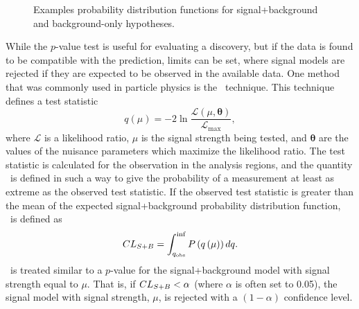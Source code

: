 \begin{figure}[t]
  \centering
  \caption{
    Examples probability distribution functions for signal+background and
    background-only hypotheses.
  }
  \label{fig:example_pdfs}
\end{figure}

While the $p$-value test is useful for evaluating a discovery, but if the
data is found to be compatible with the prediction, limits can be set, where
signal models are rejected if they are expected to be observed in the available
data.
One method that was commonly used in particle physics is the \clsb\ technique.
This technique defines a test statistic
\begin{equation}
  q\left( \mu \right) =
  -2 \ln
  \frac{\mathcal{L} \left( \mu, \boldsymbol{\theta} \right)}
  {\mathcal{L}_\mathrm{max}},
\end{equation}
where $\mathcal{L}$ is a likelihood ratio, $\mu$ is the signal strength being
tested, and $\boldsymbol{\theta}$ are the values of the nuisance parameters
which maximize the likelihood ratio.
The test statistic is calculated for the observation in the analysis regions, 
and the quantity \clsb\ is defined in such a way to give the probability
of a measurement at least as extreme as the observed test statistic.
If the observed test statistic is greater than the mean of the expected
signal+background probability distribution function, \clsb\ is defined as
\begin{equation}
  CL_{S+B} = \int_{q_\mathrm{obs}}^{\inf} P\left(q\left(\mu\right)\right) dq.
\end{equation}
\clsb\ is treated similar to a $p$-value for the signal+background model with
signal strength equal to $\mu$.
That is, if $CL_{S+B} < \alpha$ (where $\alpha$ is often set to 0.05), the signal
model with signal strength, $\mu$, is rejected with a $(1-\alpha)$ confidence
level.

